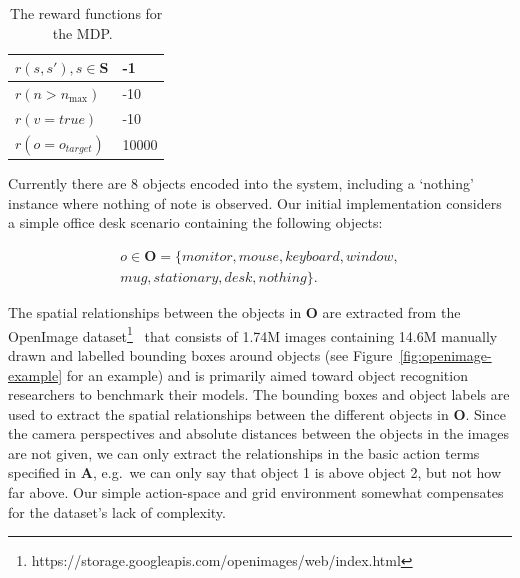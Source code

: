 \documentclass[a4paper, twoside]{article}
\begin{document}
\begin{table}
  \centering
  \caption{The reward functions for the MDP.\ }\label{tab:rewards}
  \begin{tabular}{ll}
    \toprule
    $r(s, s'), s\in\mathbf{S}$ & -1  \\ \midrule
    $r(n > n_{\max})$ & -10 \\ \midrule
    $r(v = true)$  & -10 \\ \midrule
    $r(o = o_{target})$ & 10000 \\ \midrule
    \bottomrule
  \end{tabular}
\end{table}

Currently there are 8 objects encoded into the system, including a `nothing' instance where nothing of note is observed. Our initial implementation considers a simple office desk scenario containing the following objects:

\begin{equation}
  \begin{aligned}
    o\in \mathbf{O} = \{monitor, mouse, keyboard, window,\\mug, stationary, desk, nothing\}.
  \end{aligned}
\end{equation}

The spatial relationships between the objects in $\mathbf{O}$ are extracted from the OpenImage dataset\footnote{https://storage.googleapis.com/openimages/web/index.html}~\cite{openimages} that consists of 1.74M images containing 14.6M manually drawn and labelled bounding boxes around objects (see Figure~\ref{fig:openimage-example} for an example) and is primarily aimed toward object recognition researchers to benchmark their models. The bounding boxes and object labels are used to extract the spatial relationships between the different objects in $\mathbf{O}$. Since the camera perspectives and absolute distances between the objects in the images are not given, we can only extract the relationships in the basic action terms specified in $\mathbf{A}$, e.g.\ we can only say that object 1 is above object 2, but not how far above. Our simple action-space and grid environment somewhat compensates for the dataset's lack of complexity. 
\end{document}
